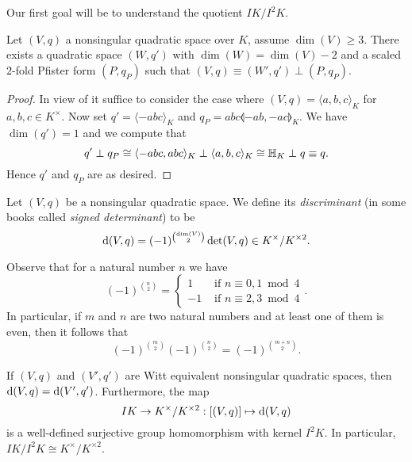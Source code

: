 \documentclass[12pt, leqno, british]{amsart}
\begin{document}
Our first goal will be to understand the quotient $I K/I^2K$.
\begin{lem}\label{L:split-off-2fold-Pfister}
Let $(V, q)$ a nonsingular quadratic space over $K$, assume $\dim(V) \geq 3$.
There exists a quadratic space $(W, q')$ with $\dim(W) = \dim(V) - 2$ and a scaled $2$-fold Pfister form $(P, q_P)$ such that $(V, q) \equiv (W', q') \perp (P, q_P)$.
\end{lem}
\begin{proof}
In view of  it suffice to consider the case where $(V, q) = \langle a, b, c \rangle_K$ for $a, b, c \in K^\times$.
Now set $q' = \langle -abc \rangle_K$ and $q_P = abc\llangle -ab, -ac \rrangle_K$.
We have $\dim(q') = 1$ and we compute that
$$q' \perp q_P \cong \langle -abc , abc \rangle_K \perp \langle a, b, c \rangle_K \cong \mathbb{H}_K \perp q \equiv q.$$
Hence $q'$ and $q_P$ are as desired.
\end{proof}
\begin{defi}
Let $(V, q)$ be a nonsingular quadratic space.
We define its \emph{discriminant} (in some books called \emph{signed determinant}) to be
$$ \mathrm{d}(V, q) = (-1)^{\binom{\dim(V)}{2}} \det(V, q) \in K^\times/K^{\times 2}.$$
\end{defi}
Observe that for a natural number $n$ we have
\begin{equation*}\label{E:binom}
(-1)^{\binom{n}{2}} = \begin{cases}
1 &\text{ if } n \equiv 0, 1 \bmod 4 \\
-1 &\text{ if } n \equiv 2, 3 \bmod 4
\end{cases}.
\end{equation*}
In particular, if $m$ and $n$ are two natural numbers and at least one of them is even, then it follows that
\begin{equation}\label{E:binom2}
(-1)^{\binom{m}{2}}(-1)^{\binom{n}{2}} = (-1)^{\binom{m+n}{2}}.
\end{equation}
\begin{prop}\label{P:disc-map}
If $(V, q)$ and $(V', q')$ are Witt equivalent nonsingular quadratic spaces, then $\mathrm{d}(V, q) = \mathrm{d}(V', q')$.
Furthermore, the map
$$ IK \to K^\times/K^{\times 2} : [(V, q)] \mapsto \mathrm{d}(V, q) $$
is a well-defined surjective group homomorphism with kernel $I^2K$.
In particular, $IK/I^2K \cong K^\times / K^{\times 2}$.
\end{prop}
\end{document}
